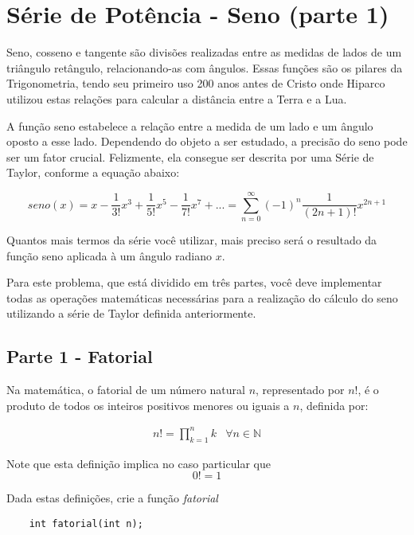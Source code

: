 \section{Série de Potência - Seno (parte 1)}
Seno, cosseno e tangente são divisões realizadas entre as medidas de lados de um triângulo retângulo, relacionando-as com ângulos. Essas funções são os pilares da Trigonometria, tendo seu primeiro uso 200 anos antes de Cristo onde Hiparco utilizou estas relações para calcular a distância entre a Terra e a Lua. 

A função seno estabelece a relação entre a medida de um lado e um ângulo oposto a esse lado. Dependendo do objeto a ser estudado, a precisão do seno pode ser um fator crucial. Felizmente, ela consegue ser descrita por uma Série de Taylor, conforme a equação abaixo:

\begin{equation*}
	seno(x) = x - \frac{1}{3!}x^3 + \frac{1}{5!}x^5-\frac{1}{7!}x^7+...=\sum_{n = 0}^{\infty }(-1)^n\frac{1}{(2n + 1)!}x^{2n + 1}
\end{equation*}

Quantos mais termos da série você utilizar, mais preciso será o resultado da função seno aplicada à um ângulo radiano $x$.


Para este problema, que está dividido em três partes, você deve implementar todas as operações matemáticas necessárias para a realização do cálculo do seno utilizando a série de Taylor definida anteriormente.

\subsection*{Parte 1 - Fatorial}
Na matemática, o fatorial de um número natural $n$, representado por $n!$, é o produto de todos os inteiros positivos menores ou iguais a $n$, definida por:

\begin{equation*}
	\begin{matrix}
		n! = \prod_{k=1}^{n}k  & \forall n\in\mathbb{N}
	\end{matrix}
\end{equation*}

Note que esta definição implica no caso particular que
\begin{equation*}
	0! = 1
\end{equation*}

Dada estas definições, crie a função \emph{fatorial}

\begin{lstlisting}
	int fatorial(int n);
\end{lstlisting}

